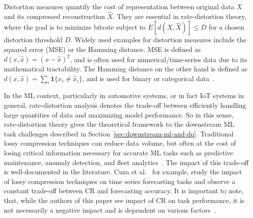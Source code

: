 Distortion measures quantify the cost of representation between original data $X$ and its compressed reconstruction $\hat{X}$. They are essential in rate-distortion theory, where the goal is to minimize bitrate subject to $E[d(X,\hat{X})] \leq D$ for a chosen distortion threshold $D$. Widely used examples for distortion measures include the squared error (MSE) or the Hamming distance. MSE is defined as $d(x,\hat{x}) = {(x - \hat{x})}^2$, and is often used for numerical/time-series data due to its mathematical tractability. The Hamming distance on the other hand is defined as $d(x,\hat{x}) = \sum_i \mathbf{1}\{x_i \neq \hat{x}_i\}$, and is used for binary or categorical data~\cite[pp.~304--305]{Cover2006}.

In the ML context, particularly in automotive systems, or in fact IoT systems in general, rate-distortion analysis denotes the trade-off between efficiently handling large quantities of data and maximizing model performance. So in this sense, rate-distortion theory gives the theoretical framework to the downstream ML task challenges described in Section~\ref{sec:downstream-ml-and-dq}. Traditional lossy compression techniques can reduce data volume, but often at the cost of losing critical information necessary for accurate ML tasks such as predictive maintenance, anomaly detection, and fleet analytics~\cite{Marchioni2024}. The impact of this trade-off is well-documented in the literature. Cuza et al.~\cite{Cuza2024} for example, study the impact of lossy compression techniques on time series forecasting tasks and observe a constant trade-off between CR and forecasting accuracy. It is important to note, that, while the authors of this paper see impact of CR on task performance, it is not necessarily a negative impact and is dependent on various factors~\cite[pp.~654--655]{Cuza2024}.

